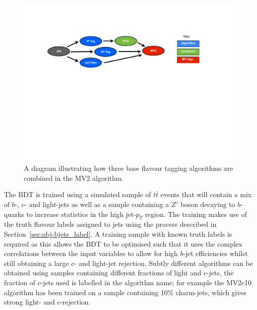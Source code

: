 \begin{figure}[!htb]
  \begin{center}
    \includegraphics[width=1.0\textwidth]{figs/Objects/MV2_schem.pdf}
    \caption{A diagram illustrating how three base flavour tagging algorithms are combined in the MV2 algorithm.}
    \label{fig:obj-MV2_schem}
  \end{center}
  \vspace{-1cm}
\end{figure}


The BDT is trained using a simulated sample of $t\bar{t}$ events that will contain a mix of  $b$-, $c$- and light-jets
as well as a sample containing a $Z'$ boson decaying to $b$-quarks to increase statistics in the high jet-$p_T$ region.
The training makes use of the truth flavour labels assigned to jets using the process described in Section~\ref{sec:obj-bjets_label}.
A training sample with known truth labels is required as this allows the BDT to be optimised
such that it uses the complex correlations between the input variables to allow for high $b$-jet efficiencies
whilst still obtaining a large $c$- and light-jet rejection.
Subtly different algorithms can be obtained using samples containing different fractions of light and $c$-jets,
the fraction of $c$-jets used is labelled in the algorithm name;
for example the MV2c10 algorithm has been trained on a sample containing 10\% charm-jets, which gives strong light- and $c$-rejection.

